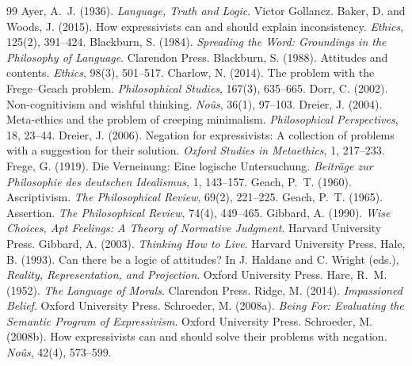 \documentclass{situationist-preprint}
\begin{document}
\begin{thebibliography}{99}\small
{} Ayer, A.~J. (1936). \emph{Language, Truth and Logic}. Victor Gollancz.
 Baker, D. and Woods, J. (2015). How expressivists can and should explain inconsistency. \emph{Ethics}, 125(2), 391--424.
 Blackburn, S. (1984). \emph{Spreading the Word: Groundings in the Philosophy of Language}. Clarendon Press.
 Blackburn, S. (1988). Attitudes and contents. \emph{Ethics}, 98(3), 501--517.
 Charlow, N. (2014). The problem with the Frege--Geach problem. \emph{Philosophical Studies}, 167(3), 635--665.
 Dorr, C. (2002). Non-cognitivism and wishful thinking. \emph{No\^us}, 36(1), 97--103.
 Dreier, J. (2004). Meta-ethics and the problem of creeping minimalism. \emph{Philosophical Perspectives}, 18, 23--44.
 Dreier, J. (2006). Negation for expressivists: A collection of problems with a suggestion for their solution. \emph{Oxford Studies in Metaethics}, 1, 217--233.
 Frege, G. (1919). Die Verneinung: Eine logische Untersuchung. \emph{Beitr\"age zur Philosophie des deutschen Idealismus}, 1, 143--157.
 Geach, P.~T. (1960). Ascriptivism. \emph{The Philosophical Review}, 69(2), 221--225.
 Geach, P.~T. (1965). Assertion. \emph{The Philosophical Review}, 74(4), 449--465.
 Gibbard, A. (1990). \emph{Wise Choices, Apt Feelings: A Theory of Normative Judgment}. Harvard University Press.
 Gibbard, A. (2003). \emph{Thinking How to Live}. Harvard University Press.
 Hale, B. (1993). Can there be a logic of attitudes? In J. Haldane and C. Wright (eds.), \emph{Reality, Representation, and Projection}. Oxford University Press.
 Hare, R.~M. (1952). \emph{The Language of Morals}. Clarendon Press.
 Ridge, M. (2014). \emph{Impassioned Belief}. Oxford University Press.
 Schroeder, M. (2008a). \emph{Being For: Evaluating the Semantic Program of Expressivism}. Oxford University Press.
 Schroeder, M. (2008b). How expressivists can and should solve their problems with negation. \emph{No\^us}, 42(4), 573--599.

\end{thebibliography}
\end{document}
